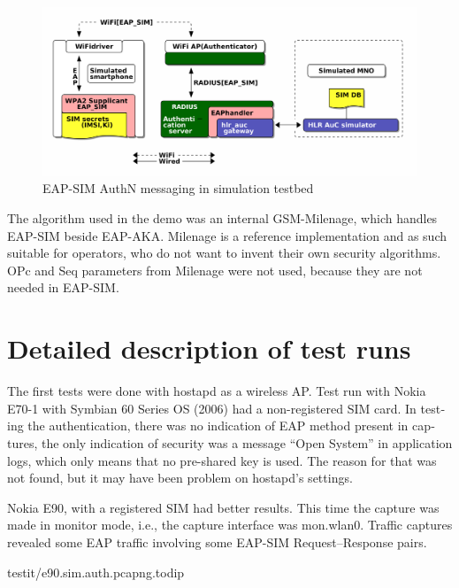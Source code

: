 \documentclass[12pt,a4paper,english]{tutthesis}
\begin{document}
\begin{otherlanguage}{english}
\begin{figure}[htb]
\centering
\includegraphics[width=.9\linewidth]{demoinfra.png}
\caption{\label{eap-sim-testbed}EAP-SIM AuthN messaging in simulation testbed}
\end{figure}





The algorithm used in the demo was an internal GSM-Milenage,
which handles EAP-SIM beside EAP-AKA.
Milenage is a reference implementation and as such suitable for operators, who do not 
want to invent their own security algorithms. OPc and Seq parameters from
Milenage were not used, because they are not needed in EAP-SIM. 

\section{Detailed description of test runs}
\label{sec-5-2}


The first tests were done with hostapd as a wireless AP.
Test run with Nokia E70-1 with Symbian 60 Series OS (2006) had a
non-registered SIM card. 
In testing the authentication,
there was no indication of EAP method present in captures, the only
indication of security was a message ``Open System'' in application
logs, which only means that no pre-shared key is used. The reason for
that was not found, but it may have been problem on hostapd's settings.




Nokia E90, with a registered SIM had better results. 
This time the capture was made in monitor mode, i.e., 
the capture interface was mon.wlan0.
Traffic captures revealed some EAP traffic involving some EAP-SIM
Request--Response pairs.


\renewcommand{\lstlistingname}{Capture}

  {testit/e90.sim.auth.pcapng.todip}


\end{otherlanguage}
\end{document}
